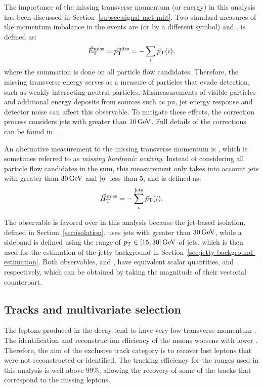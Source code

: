 The importance of the missing transverse momentum (or energy) in this analysis has been discussed in Section~\ref{subsec:signal-met-mht}. Two standard measures of the momentum imbalance in the events are \VEtmiss (or \ptvecmiss by a different symbol) and \htvecmiss. \VEtmiss is defined as:
\begin{equation}
{\vec E}_{\mathrm{T}}^{\text{miss}} = {\vec p}_{\mathrm{T}}^{\kern1pt\text{miss}} = -\sum_i {\vec p}_{\mathrm{T}}(i),
\end{equation}
where the summation is done on all particle flow candidates. Therefore, the missing transverse energy serves as a measure of particles that evade detection, such as weakly interacting neutral particles. Mismeasurements of visible particles and additional energy deposits from sources such as \gls{pu}, jet energy response and detector noise can affect this observable. To mitigate these effects, the correction process considers jets with \pt greater than $10\,\text{Ge\hspace{-.08em}V}$. Full details of the corrections can be found in~\cite{met_performance}.

An alternative measurement to the missing transverse momentum is \htvecmiss, which is sometimes referred to as \emph{missing hardronic activity}. Instead of considering all particle flow candidates in the sum, this measurement only takes into account jets with \pt greater than $30\,\text{Ge\hspace{-.08em}V}$ and $\abs{\eta}$ less than 5, and is defined as:
\begin{equation}
\vec{H}_{\text{T}}^{\text{miss}} = -\sum_i^{\mathrm{jets}} {\vec p}_{\mathrm{T}}(i).
\end{equation}

The observable \htvecmiss is favored over \VEtmiss in this analysis because the jet-based isolation, defined in Section~\ref{sec:isolation}, uses jets with \pt greater than $30\,\text{Ge\hspace{-.08em}V}$, while a sideband is defined using the range of $p_{\mathrm{T}}\in [15,30]\,\text{Ge\hspace{-.08em}V}$ of jets, which is then used for the estimation of the jetty background in Section~\ref{sec:jetty-background-estimation}. Both observables, \VEtmiss and \htvecmiss, have equivalent scalar quantities, \MET and \mht respectively, which can be obtained by taking the magnitude of their vectorial counterpart.

\clearpage
\subsection{Tracks and multivariate selection}
\label{sec:track-bdt}

The leptons \ellell produced in the decay \neuttdecay tend to have very low transverse momentum \pt. The identification and reconstruction efficiency of the muons worsens with lower \pt. Therefore, the aim of the exclusive track category is to recover lost leptons that were not reconstructed or identified. The tracking efficiency for the \pt ranges used in this analysis is well above 99\%, allowing the recovery of some of the  tracks that correspond to the missing leptons.

